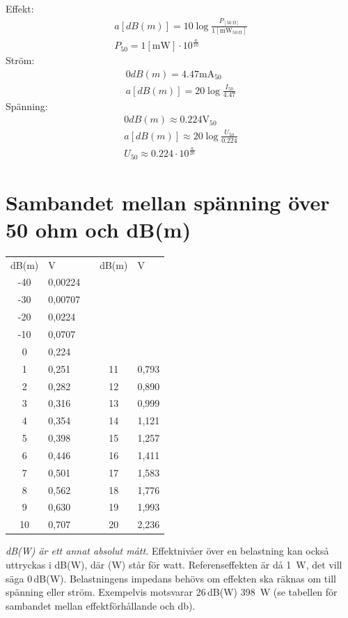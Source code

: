 \noindent
Effekt:
\begin{gather*}
  a [dB(m)] = 10 \log\frac{P_{[\qty{50}{\ohm}]}}{1[\unit{\milli\watt}_{\qty{50}{\ohm}}]} \\
  P_{50} = 1 [\unit{\milli\watt}] \cdot 10^{\frac{a}{10}}
\end{gather*}
Ström:
\begin{gather*}
  0 dB(m) = 4.47 \unit{\milli\ampere}_{50} \\
  a [dB(m)] = 20 \log\frac{I_{50}}{4.47}
\end{gather*}
Spänning:
\begin{gather*}
  0 dB(m) \approx 0.224 \unit{\volt}_{50} \\
  a [dB(m)] \approx 20 \log\frac{U_{50}}{0.224} \\
  U_{50} \approx 0.224 \cdot 10^{\frac{a}{20}}
\end{gather*}

\section{Sambandet mellan spänning över 50 ohm och dB(m)}

\begin{center}
\begin{tabular}{S[table-format=-3]|lp{1cm}S[table-format=-2]|l}
   & V & &   & V \\
   
  -40 & 0,00224 & & & \\
  -30 & 0,00707 & & & \\
  -20 & 0,0224  & & & \\
  -10 & 0,0707  & & & \\
  0   & 0,224   & & & \\
  1   & 0,251   & & 11 & 0,793 \\
  2   & 0,282   & & 12 & 0,890 \\
  3   & 0,316   & & 13 & 0,999 \\
  4   & 0,354   & & 14 & 1,121 \\
  5   & 0,398   & & 15 & 1,257 \\
  6   & 0,446   & & 16 & 1,411 \\
  7   & 0,501   & & 17 & 1,583 \\
  8   & 0,562   & & 18 & 1,776 \\
  9   & 0,630   & & 19 & 1,993 \\
  10  & 0,707   & & 20 & 2,236 \\
\end{tabular}
\end{center}

\emph{dB(W) är ett annat absolut mått.}
Effektnivåer över en belastning kan också uttryckas i dB(W), där (W) står
för watt.
Referenseffekten är då \qty{1}{\watt}, det vill säga 0\,dB(W).
Belastningens impedans behövs om effekten ska räknas om till spänning eller
ström.
Exempelvis motsvarar 26\,dB(W) \qty{398}{\watt} (se tabellen för sambandet
mellan effektförhållande och \unit{\decibel}).
